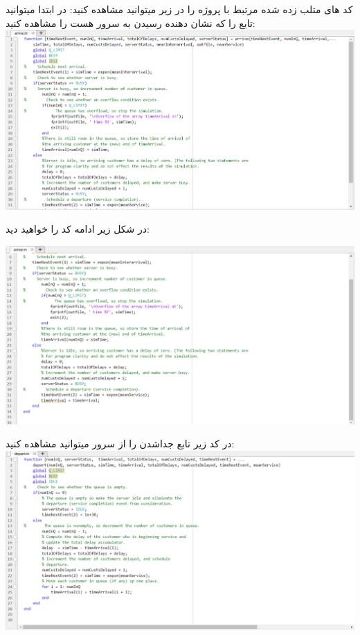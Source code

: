 \documentclass[12pt,a4paper]{report}
\begin{document}
	\pagebreak
	
	\section*{}
	
	
	کد های متلب زده شده مرتبط با پروژه را در زیر میتوانید مشاهده کنید:
	در ابتدا میتوانید تایع 
	را که نشان دهنده رسیدن به سرور هست را مشاهده کنید:\\
	
	\includegraphics[scale=0.6]{Figures/A1}
	
	در شکل زیر ادامه کد را خواهید دید:
	
	\includegraphics[scale=0.6]{Figures/A2}
	
	\pagebreak
	
	در کد زیر تابع جداشدن را از سرور میتوانید مشاهده کنید:\\
	
	\includegraphics[scale=0.6]{Figures/D}
	
\end{document}
